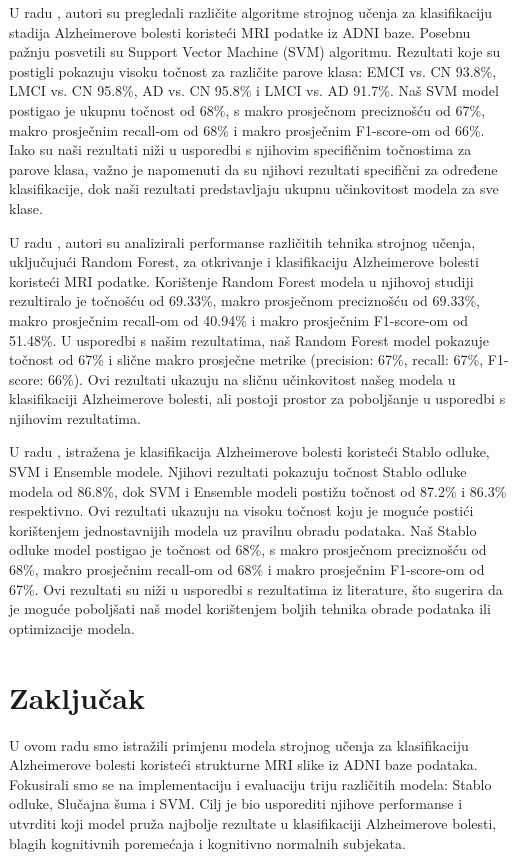 \documentclass[zavrsnirad]{fer}
\begin{document}
U radu \cite{IRJET}, autori su pregledali različite algoritme strojnog učenja za klasifikaciju stadija Alzheimerove bolesti koristeći MRI podatke iz ADNI baze. Posebnu pažnju posvetili su Support Vector Machine (SVM) algoritmu. Rezultati koje su postigli pokazuju visoku točnost za različite parove klasa: EMCI vs. CN 93.8\%, LMCI vs. CN 95.8\%, AD vs. CN 95.8\% i LMCI vs. AD 91.7\%. Naš SVM model postigao je ukupnu točnost od 68\%, s makro prosječnom preciznošću od 67\%, makro prosječnim recall-om od 68\% i makro prosječnim F1-score-om od 66\%. Iako su naši rezultati niži u usporedbi s njihovim specifičnim točnostima za parove klasa, važno je napomenuti da su njihovi rezultati specifični za određene klasifikacije, dok naši rezultati predstavljaju ukupnu učinkovitost modela za sve klase.

U radu \cite{AnalysisPerformance}, autori su analizirali performanse različitih tehnika strojnog učenja, uključujući Random Forest, za otkrivanje i klasifikaciju Alzheimerove bolesti koristeći MRI podatke. Korištenje Random Forest modela u njihovoj studiji rezultiralo je točnošću od 69.33\%, makro prosječnom preciznošću od 69.33\%, makro prosječnim recall-om od 40.94\% i makro prosječnim F1-score-om od 51.48\%. U usporedbi s našim rezultatima, naš Random Forest model pokazuje točnost od 67\% i slične makro prosječne metrike (precision: 67\%, recall: 67\%, F1-score: 66\%). Ovi rezultati ukazuju na sličnu učinkovitost našeg modela u klasifikaciji Alzheimerove bolesti, ali postoji prostor za poboljšanje u usporedbi s njihovim rezultatima.

U radu \cite{asi}, istražena je klasifikacija Alzheimerove bolesti koristeći Stablo odluke, SVM i Ensemble modele. Njihovi rezultati pokazuju točnost Stablo odluke modela od 86.8\%, dok SVM i Ensemble modeli postižu točnost od 87.2\% i 86.3\% respektivno. Ovi rezultati ukazuju na visoku točnost koju je moguće postići korištenjem jednostavnijih modela uz pravilnu obradu podataka. Naš Stablo odluke model postigao je točnost od 68\%, s makro prosječnom preciznošću od 68\%, makro prosječnim recall-om od 68\% i makro prosječnim F1-score-om od 67\%. Ovi rezultati su niži u usporedbi s rezultatima iz literature, što sugerira da je moguće poboljšati naš model korištenjem boljih tehnika obrade podataka ili optimizacije modela.
\chapter{Zaključak}
\label{pog:zakljucak}
U ovom radu smo istražili primjenu modela strojnog učenja za klasifikaciju Alzheimerove bolesti koristeći strukturne MRI slike iz ADNI baze podataka. Fokusirali smo se na implementaciju i evaluaciju triju različitih modela: Stablo odluke, Slučajna šuma i SVM. Cilj je bio usporediti njihove performanse i utvrditi koji model pruža najbolje rezultate u klasifikaciji Alzheimerove bolesti, blagih kognitivnih poremećaja i kognitivno normalnih subjekata.
\end{document}
